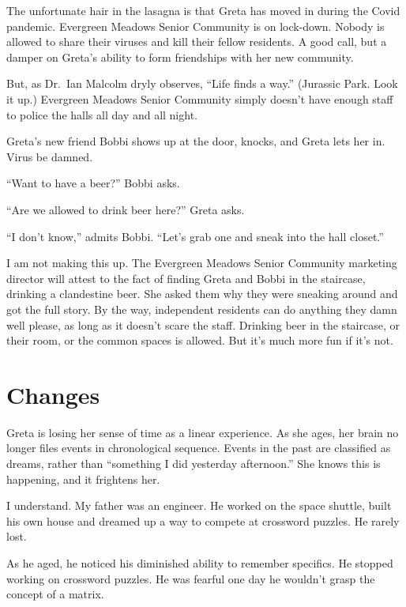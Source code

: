 \documentclass[
  letterpaper,
  DIV=11,
  numbers=noendperiod]{scrreprt}
\begin{document}
The unfortunate hair in the lasagna is that Greta has moved in during
the Covid pandemic. Evergreen Meadows Senior Community is on lock-down.
Nobody is allowed to share their viruses and kill their fellow
residents. A good call, but a damper on Greta's ability to form
friendships with her new community.

But, as Dr.~Ian Malcolm dryly observes, ``Life finds a way.'' (Jurassic
Park. Look it up.) Evergreen Meadows Senior Community simply doesn't
have enough staff to police the halls all day and all night.

Greta's new friend Bobbi shows up at the door, knocks, and Greta lets
her in. Virus be damned.

``Want to have a beer?'' Bobbi asks.

``Are we allowed to drink beer here?'' Greta asks.

``I don't know,'' admits Bobbi. ``Let's grab one and sneak into the hall
closet.''

I am not making this up. The Evergreen Meadows Senior Community
marketing director will attest to the fact of finding Greta and Bobbi in
the staircase, drinking a clandestine beer. She asked them why they were
sneaking around and got the full story. By the way, independent
residents can do anything they damn well please, as long as it doesn't
scare the staff. Drinking beer in the staircase, or their room, or the
common spaces is allowed. But it's much more fun if it's not.

\section*{Changes}\label{changes}


Greta is losing her sense of time as a linear experience. As she ages,
her brain no longer files events in chronological sequence. Events in
the past are classified as dreams, rather than ``something I did
yesterday afternoon.'' She knows this is happening, and it frightens
her.

I understand. My father was an engineer. He worked on the space shuttle,
built his own house and dreamed up a way to compete at crossword
puzzles. He rarely lost.

As he aged, he noticed his diminished ability to remember specifics. He
stopped working on crossword puzzles. He was fearful one day he wouldn't
grasp the concept of a matrix.
\end{document}
